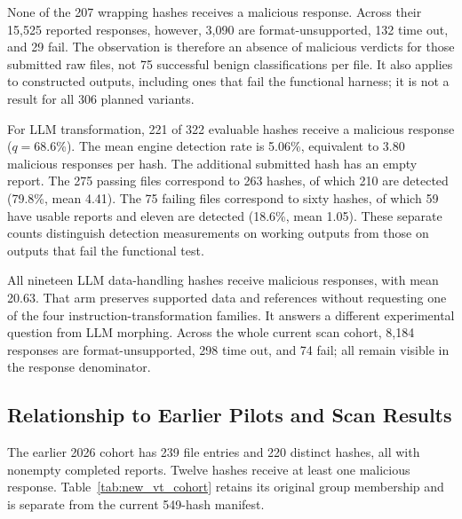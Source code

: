 None of the 207 wrapping hashes receives a malicious response. Across
their 15,525 reported responses, however, 3,090 are format-unsupported,
132 time out, and 29 fail. The observation is therefore an absence of
malicious verdicts for those submitted raw files, not 75 successful benign
classifications per file. It also applies to constructed outputs, including
ones that fail the functional harness; it is not a result for all 306
planned variants.

For LLM transformation, 221 of 322 evaluable hashes receive a malicious
response ($q=68.6$\%). The mean engine detection rate is 5.06\%,
equivalent to 3.80 malicious responses per hash. The
additional submitted hash has an empty report. The 275 passing files
correspond to 263 hashes, of which 210 are detected (79.8\%, mean 4.41).
The 75 failing files correspond to sixty hashes, of which 59 have usable
reports and eleven are detected (18.6\%, mean 1.05). These separate counts distinguish detection measurements on working
outputs from those on outputs that fail the functional test.

All nineteen LLM data-handling hashes receive malicious responses, with
mean 20.63. That arm preserves supported data and references without
requesting one of the four instruction-transformation families. It answers
a different experimental question from LLM morphing. Across the whole
current scan cohort, 8,184 responses are format-unsupported, 298 time out,
and 74 fail; all remain visible in the response denominator.

\subsection{Relationship to Earlier Pilots and Scan Results}
The earlier 2026 cohort has 239 file entries and 220 distinct hashes,
all with nonempty completed reports. Twelve hashes receive at least one
malicious response. Table~\ref{tab:new_vt_cohort} retains its original group
membership and is separate from the current 549-hash manifest.


